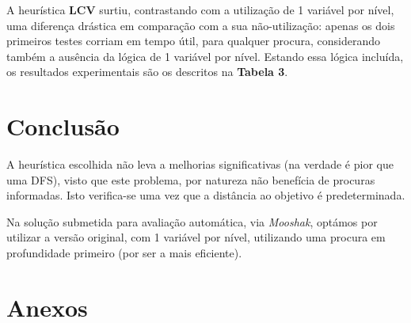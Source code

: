 \documentclass[12pt,a4paper]{article}
\begin{document}

A heurística \textbf{LCV} surtiu, contrastando com a utilização de 1 variável por nível,
uma diferença drástica em comparação com a sua não-utilização: apenas os
dois primeiros testes corriam em tempo útil, para qualquer procura, considerando
também a ausência da lógica de 1 variável por nível. Estando essa lógica
incluída, os resultados experimentais são os descritos na \textbf{Tabela 3}.

\section*{Conclusão}

A heurística escolhida não leva a melhorias significativas (na verdade é pior que uma DFS), visto que este problema, por natureza não benefícia de procuras informadas.
Isto verifica-se uma vez que a distância ao objetivo é predeterminada.

 Na solução submetida para avaliação automática, via \textit{Mooshak}, optámos por utilizar a versão original, com 1 variável por nível, utilizando uma procura em profundidade primeiro (por ser a mais eficiente).


\section*{Anexos}

\end{document}
